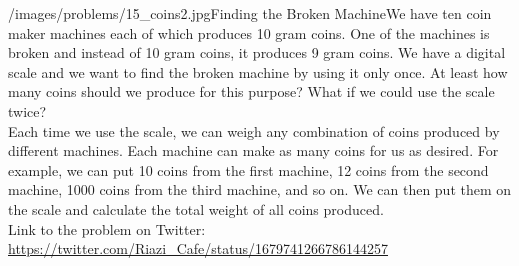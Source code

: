 \begin{problem}{/images/problems/15_coins2.jpg}{Finding the Broken Machine}We have ten coin maker machines each of which produces 10 gram coins. One of the machines is broken and instead of 10 gram coins, it produces 9 gram coins. We have a digital scale and we want to find the broken machine by using it only once. At least how many coins should we produce for this purpose? What if we could use the scale twice? \\[0.2cm]

Each time we use the scale, we can weigh any combination of coins produced by different machines. Each machine can make as many coins for us as desired. For example, we can put 10 coins from the first machine, 12 coins from the second machine, 1000 coins from the third machine, and so on. We can then put them on the scale and calculate the total weight of all coins produced.\\[0.2cm]

Link to the problem on Twitter:  \url{https://twitter.com/Riazi_Cafe/status/1679741266786144257}\end{problem}
